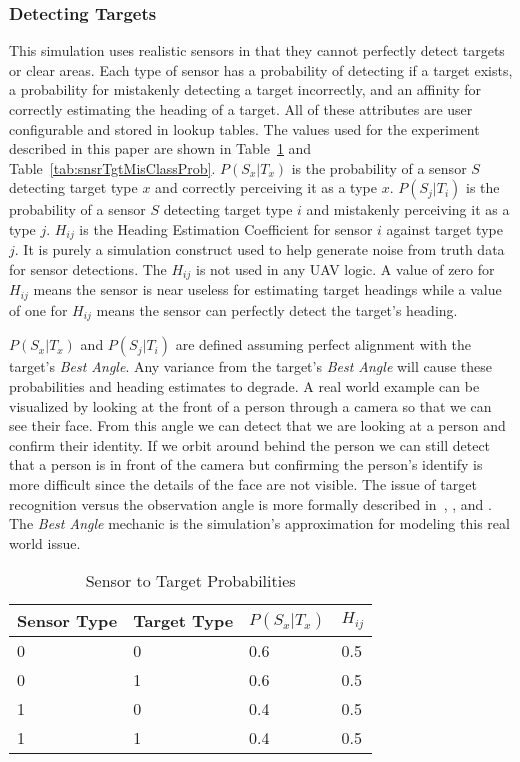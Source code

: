 \subsubsection{Detecting Targets}
\label{sec:sensor_var_descriptions}
This simulation uses realistic sensors in that they cannot perfectly detect targets or clear areas.  Each type of sensor has a probability of detecting if a target exists, a probability for mistakenly detecting a target incorrectly, and an affinity for correctly estimating the heading of a target.  All of these attributes are user configurable and stored in lookup tables.  The values used for the experiment described in this paper are shown in Table~\ref{tab:snsrTgtProb} and Table~\ref{tab:snsrTgtMisClassProb}.  $P(S_{x}|T_{x})$ is the probability of a sensor $S$ detecting target type $x$ and correctly perceiving it as a type $x$.  $P(S_{j}|T_{i})$ is the probability of a sensor $S$ detecting target type $i$ and mistakenly perceiving it as a type $j$.  $H_{ij}$ is the Heading Estimation Coefficient for sensor $i$ against target type $j$.  It is purely a simulation construct used to help generate noise from truth data for sensor detections.  The $H_{ij}$ is not used in any UAV logic.  A value of zero for $H_{ij}$ means the sensor is near useless for estimating target headings while a value of one for $H_{ij}$ means the sensor can perfectly detect the target's heading.

$P(S_{x}|T_{x})$ and $P(S_{j}|T_{i})$ are defined assuming perfect alignment with the target's \textit{Best Angle}.  Any variance from the target's \textit{Best Angle} will cause these probabilities and heading estimates to degrade.  A real world example can be visualized by looking at the front of a person through a camera so that we can see their face.  From this angle we can detect that we are looking at a person and confirm their identity.  If we orbit around behind the person we can still detect that a person is in front of the camera but confirming the person's identify is more difficult since the details of the face are not visible.  The issue of target recognition versus the observation angle is more formally  described in~\textcite{min_risk_angle}, \textcite{min_angle_res_vs_regard}, and \textcite{accuracy_2d_geometry}.  The \textit{Best Angle} mechanic is the simulation's approximation for modeling this real world issue.

\begin{table}[H]
	\caption{Sensor to Target Probabilities}
	\centering
	\label{tab:snsrTgtProb}
	\begin{tabular}{|p{1.2cm}|p{1.2cm}|p{1.5cm}|p{1cm}|}
		\hline
		Sensor Type & Target Type & $P(S_{x}|T_{x})$ & $H_{ij}$\\ \hline
		0 & 0 & 0.6 & 0.5 \\  \hline
		0 & 1 & 0.6 & 0.5 \\  \hline
		1 & 0 & 0.4 & 0.5 \\  \hline
		1 & 1 & 0.4 & 0.5 \\  \hline
	\end{tabular}
\end{table}

